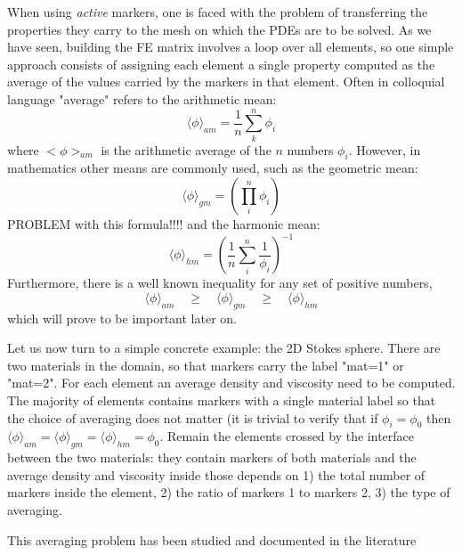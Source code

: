 When using {\it active} markers, one is faced with the problem of transferring the properties they carry to the mesh on which the PDEs are to be solved. 
As we have seen, building the FE matrix involves a loop over all elements, so one simple approach consists of assigning each element a single property
computed as the average of the values carried by the markers in that element. 
Often in colloquial language "average" refers to the arithmetic mean: 
\begin{equation}
\langle \phi \rangle_{am}=\frac{1}{n} \sum_k^n \phi_i 
\end{equation}
where $<\phi>_{am}$ is the arithmetic average of the $n$ numbers $\phi_i$. 
However, in mathematics other means are commonly used, such as the geometric mean: 
\begin{equation}
\langle \phi \rangle_{gm}=\left( \prod_i^n \phi_i \right)
\end{equation}
PROBLEM with this formula!!!!
and the harmonic mean: 
\begin{equation}
\langle \phi \rangle_{hm}=\left( \frac{1}{n}\sum_i^n \frac{1}{\phi_i} \right)^{-1}
\end{equation}
Furthermore, there is a well known inequality for any set of positive numbers,
\begin{equation}
\langle \phi \rangle_{am}\quad  \geq \quad
\langle \phi \rangle_{gm}\quad  \geq \quad
\langle \phi \rangle_{hm} 
\end{equation}
which will prove to be important later on. 

Let us now turn to a simple concrete example: the 2D Stokes sphere. 
There are two materials in the domain, so that markers carry the label "mat=1" or "mat=2".
For each element an average density and viscosity need to be computed. The majority of elements contains markers
with a single material label so that the choice of averaging does not matter (it is trivial to verify that 
if $\phi_i=\phi_0$ then $\langle \phi \rangle_{am}=\langle \phi \rangle_{gm}=\langle \phi \rangle_{hm}=\phi_0$.
Remain the elements crossed by the interface between the two materials: they contain markers of both materials
and the average density and viscosity inside those depends on 1) the total number of markers inside the element, 
2) the ratio of markers 1 to markers 2, 3) the type of averaging. 

This averaging problem has been studied and documented in the literature \cite{scbe08,deka08,thmk14,pukp16}

